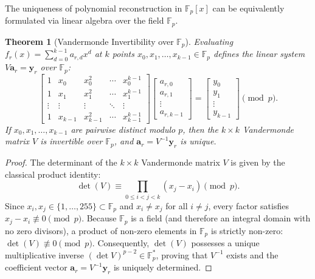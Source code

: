 \documentclass[11pt,a4paper]{article}
\newtheorem{theorem}{Theorem}[section]
\theoremstyle{definition}
\newcommand{\Fp}{\mathbb{F}_p}
\newcommand{\Fps}{\mathbb{F}_p^*}
\begin{document}
The uniqueness of polynomial reconstruction in $\Fp[x]$ can be equivalently formulated via linear algebra over the field $\Fp$.

\begin{theorem}[Vandermonde Invertibility over $\Fp$]
Evaluating $f_r(x) = \sum_{d=0}^{k-1} a_{r,d} x^d$ at $k$ points $x_0, x_1, \dots, x_{k-1} \in \Fp$ defines the linear system $V \mathbf{a}_r = \mathbf{y}_r$ over $\Fp$:
\begin{equation}
    \begin{bmatrix}
        1 & x_0 & x_0^2 & \cdots & x_0^{k-1} \\
        1 & x_1 & x_1^2 & \cdots & x_1^{k-1} \\
        \vdots & \vdots & \vdots & \ddots & \vdots \\
        1 & x_{k-1} & x_{k-1}^2 & \cdots & x_{k-1}^{k-1}
    \end{bmatrix}
    \begin{bmatrix}
        a_{r,0} \\ a_{r,1} \\ \vdots \\ a_{r,k-1}
    \end{bmatrix}
    =
    \begin{bmatrix}
        y_0 \\ y_1 \\ \vdots \\ y_{k-1}
    \end{bmatrix}
    \pmod p.
\end{equation}
If $x_0, x_1, \dots, x_{k-1}$ are pairwise distinct modulo $p$, then the $k \times k$ Vandermonde matrix $V$ is invertible over $\Fp$, and $\mathbf{a}_r = V^{-1} \mathbf{y}_r$ is unique.
\end{theorem}
\begin{proof}
The determinant of the $k \times k$ Vandermonde matrix $V$ is given by the classical product identity:
\[
    \det(V) \equiv \prod_{0 \le i < j < k} (x_j - x_i) \pmod p.
\]
Since $x_i, x_j \in \{1, \dots, 255\} \subset \Fp$ and $x_i \neq x_j$ for all $i \neq j$, every factor satisfies $x_j - x_i \not\equiv 0 \pmod p$. Because $\Fp$ is a field (and therefore an integral domain with no zero divisors), a product of non-zero elements in $\Fp$ is strictly non-zero: $\det(V) \not\equiv 0 \pmod p$. Consequently, $\det(V)$ possesses a unique multiplicative inverse $(\det V)^{p-2} \in \Fps$, proving that $V^{-1}$ exists and the coefficient vector $\mathbf{a}_r = V^{-1} \mathbf{y}_r$ is uniquely determined.
\end{proof}
\end{document}
